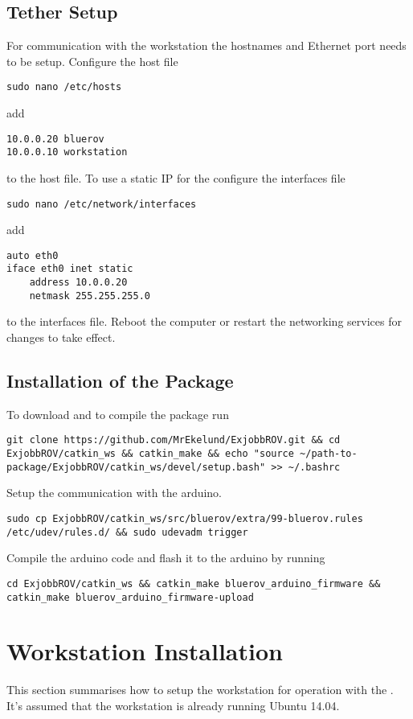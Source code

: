 \subsection{Tether Setup}
For communication with the workstation the hostnames and Ethernet port needs to be setup.
Configure the host file 
\begin{lstlisting}
sudo nano /etc/hosts
\end{lstlisting}
add
\begin{lstlisting}
10.0.0.20 bluerov
10.0.0.10 workstation
\end{lstlisting}
to the host file. To use a static IP for the \abbrROV configure the interfaces file
\begin{lstlisting}
sudo nano /etc/network/interfaces
\end{lstlisting}
add 
\begin{lstlisting}
auto eth0
iface eth0 inet static
    address 10.0.0.20
    netmask 255.255.255.0
\end{lstlisting}
to the interfaces file. Reboot the computer or restart the networking services for changes to take effect.

\subsection{Installation of the \abbrROV Package}
To download and to compile the package run
\begin{lstlisting}
git clone https://github.com/MrEkelund/ExjobbROV.git && cd ExjobbROV/catkin_ws && catkin_make && echo "source ~/path-to-package/ExjobbROV/catkin_ws/devel/setup.bash" >> ~/.bashrc 
\end{lstlisting}

Setup the communication with the arduino.
\begin{lstlisting}
sudo cp ExjobbROV/catkin_ws/src/bluerov/extra/99-bluerov.rules /etc/udev/rules.d/ && sudo udevadm trigger
\end{lstlisting}

Compile the arduino code and flash it to the arduino by running
\begin{lstlisting}
cd ExjobbROV/catkin_ws && catkin_make bluerov_arduino_firmware && catkin_make bluerov_arduino_firmware-upload
\end{lstlisting}

\section{Workstation Installation}
This section summarises how to setup the workstation for operation with the \abbrROV. It's assumed that the workstation is already running Ubuntu 14.04. 

